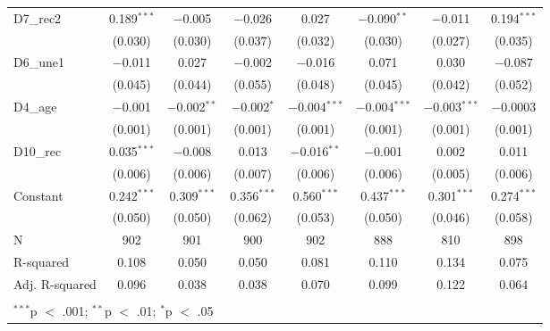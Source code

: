 \documentclass[
]{article}
\begin{document}
\begin{table}[!htbp]
\begin{tabular}{@{\extracolsep{5pt}}lccccccc}
  D7\_rec2 & 0.189$^{***}$ & $-$0.005 & $-$0.026 & 0.027 & $-$0.090$^{**}$ & $-$0.011 & 0.194$^{***}$ \\ 
  & (0.030) & (0.030) & (0.037) & (0.032) & (0.030) & (0.027) & (0.035) \\ 
  D6\_une1 & $-$0.011 & 0.027 & $-$0.002 & $-$0.016 & 0.071 & 0.030 & $-$0.087 \\ 
  & (0.045) & (0.044) & (0.055) & (0.048) & (0.045) & (0.042) & (0.052) \\ 
  D4\_age & $-$0.001 & $-$0.002$^{**}$ & $-$0.002$^{*}$ & $-$0.004$^{***}$ & $-$0.004$^{***}$ & $-$0.003$^{***}$ & $-$0.0003 \\ 
  & (0.001) & (0.001) & (0.001) & (0.001) & (0.001) & (0.001) & (0.001) \\ 
  D10\_rec & 0.035$^{***}$ & $-$0.008 & 0.013 & $-$0.016$^{**}$ & $-$0.001 & 0.002 & 0.011 \\ 
  & (0.006) & (0.006) & (0.007) & (0.006) & (0.006) & (0.005) & (0.006) \\ 
  Constant & 0.242$^{***}$ & 0.309$^{***}$ & 0.356$^{***}$ & 0.560$^{***}$ & 0.437$^{***}$ & 0.301$^{***}$ & 0.274$^{***}$ \\ 
  & (0.050) & (0.050) & (0.062) & (0.053) & (0.050) & (0.046) & (0.058) \\ 
 N & 902 & 901 & 900 & 902 & 888 & 810 & 898 \\ 
R-squared & 0.108 & 0.050 & 0.050 & 0.081 & 0.110 & 0.134 & 0.075 \\ 
Adj. R-squared & 0.096 & 0.038 & 0.038 & 0.070 & 0.099 & 0.122 & 0.064 \\ 
\hline \\[-1.8ex] 
\multicolumn{8}{l}{$^{***}$p $<$ .001; $^{**}$p $<$ .01; $^{*}$p $<$ .05} \\ 
\end{tabular} 
\end{table}
\end{document}
